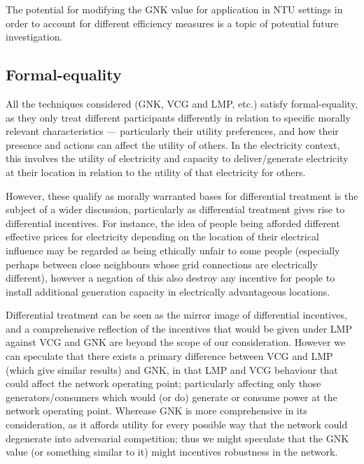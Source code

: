 The potential for modifying the GNK value for application in NTU settings in order to account for different efficiency measures is a topic of potential future investigation.

\subsection{Formal-equality}

All the techniques considered (GNK, VCG and LMP, etc.) satisfy formal-equality, as they only treat different participants differently in relation to specific morally relevant characteristics --- particularly their utility preferences, and how their presence and actions can affect the utility of others.
In the electricity context, this involves the utility of electricity and capacity to deliver/generate electricity at their location in relation to the utility of that electricity for others.

However, \DIFdelbegin {}\DIFdelend \DIFaddbegin {}\DIFaddend these qualify as morally warranted bases for differential treatment is the subject of a wider discussion, particularly as differential treatment gives rise to differential incentives.
For instance, the idea of people being afforded different effective prices for electricity depending on the location of their electrical influence may be regarded as being ethically unfair to some people (especially perhaps between close neighbours whose grid connections are electrically different), however a negation of this also destroy any incentive for people to install additional generation capacity in electrically advantageous locations.

Differential treatment can be seen as the mirror image of differential incentives, and a comprehensive reflection of the incentives that would be given under LMP against VCG and GNK are beyond the scope of our consideration.
However we can speculate that there exists a primary difference between VCG and LMP (which give similar results) and GNK, in that LMP and VCG \DIFdelbegin {}\DIFdelend \DIFaddbegin {}\DIFaddend behaviour that could affect the network operating point; particularly affecting only those generators/consumers which would (or do) generate or consume power at the network operating point.
Wherease GNK is more comprehensive in its consideration, as it affords utility for every possible way that the network could degenerate into adversarial competition; thus we might speculate that the GNK value (or something similar to it) might incentives robustness in the network.

